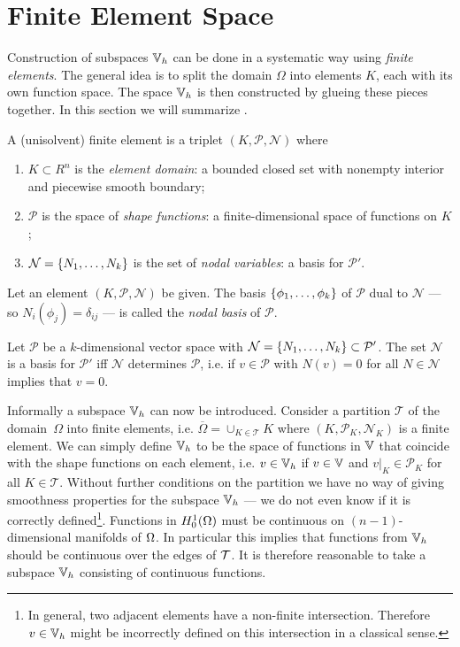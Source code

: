 \documentclass[thesis.tex]{subfiles}
\begin{document}
\section{Finite Element Space}
  \label{sec:deffem}
  Construction of subspaces $\mathbb{V}_h$ can be done in a systematic way using \emph{finite elements}. 
  The general idea is to split the domain $\Omega$ into elements $K$, each with its own function space.
  The space $\mathbb{V}_h$ is then constructed by glueing these pieces together. In this section we will summarize \cite[Ch~3]{brenner}.
  \begin{defn} 
    A (unisolvent) finite element is a triplet $(K, \mathcal{P}, \mathcal{N})$ where
    \begin{enumerate}[label=(\alph*)]
      \item $K \subset R^n$ is the \emph{element domain}: a bounded closed set with nonempty interior and piecewise smooth boundary;
    \item $\mathcal{P}$ is the space of \emph{shape functions}: a finite-dimensional space of functions on $K$;
  \item $\mathcal{N} = \set{N_1, \dots, N_k}$ is the set of \emph{nodal variables}: a basis for $\mathcal{P}'$.
    \end{enumerate}
  \end{defn}
  \begin{defn}
    \label{def:dualbasis}
    Let an element $(K, \mathcal{P}, \mathcal{N})$ be given. The basis $\set{\phi_1, \dots, \phi_k}$ of $\mathcal{P}$ dual to $\mathcal{N}$ --- so $N_i(\phi_j) = \delta_{ij}$ --- is called the \emph{nodal basis} of $\mathcal{P}$.
  \end{defn}
  \begin{lem}
    Let $\mathcal{P}$ be a $k$-dimensional vector space with $\mathcal{N} = \set{N_1, \dots, N_k} \subset \mathcal{P}'$.
    The set $\mathcal{N}$ is a basis for $\mathcal{P}'$ iff $\mathcal{N}$ determines $\mathcal{P}$, i.e. if $v \in \mathcal{P}$ with $N(v) = 0$ for all $N \in \mathcal{N}$ implies that $v = 0$.
  \end{lem}
  Informally a subspace $\mathbb{V}_h$ can now be introduced. Consider a partition $\mathcal{T}$ of the domain~$\Omega$ into finite elements,
  i.e. $\overline{\Omega} = \cup_{K \in \mathcal{T}} K$ where $(K, \mathcal{P}_K, \mathcal{N}_K)$ is a finite element.
  We can simply define $\mathbb{V}_h$ to be the space of functions in $\mathbb{V}$ that coincide with the shape functions on each element,
  i.e. $v \in \mathbb{V}_h$ if $v \in \mathbb{V}$ and $v|_{K} \in \mathcal{P}_K$ for all $K \in \mathcal{T}$. 
  Without further conditions on the partition we have no way of giving smoothness  properties for the subspace $\mathbb{V}_h$ --- we do not even know if it is correctly defined\footnote{In general, two adjacent elements have a non-finite intersection. 
  Therefore $v \in \mathbb{V}_h$ might be incorrectly defined on this intersection in a classical sense.}.
  Functions in $H_0^1(\Omega)$ must be continuous on $(n-1)$-dimensional manifolds of $\Omega$. In particular this implies
  that functions from $\mathbb{V}_h$ should be continuous over the edges of $\mathcal{T}$. It is therefore reasonable to take a subspace $\mathbb{V}_h$ consisting
  of continuous functions.
\end{document}
